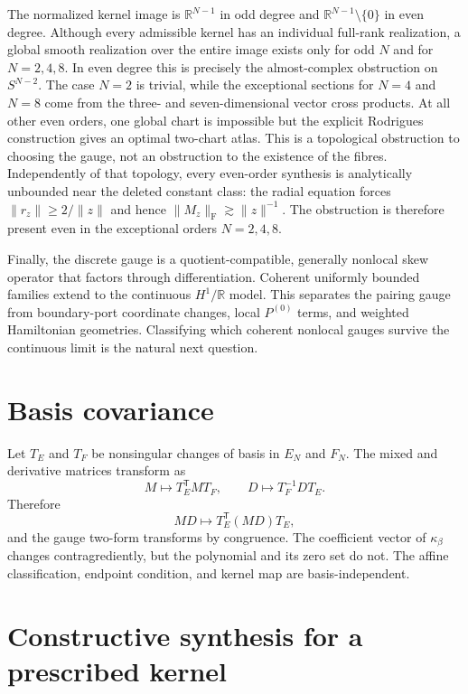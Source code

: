 \documentclass[11pt,a4paper]{article}
\theoremstyle{definition}
\theoremstyle{remark}
\newcommand{\R}{\mathbb{R}}
\begin{document}
The normalized kernel image is $\R^{N-1}$ in odd degree and
$\R^{N-1}\setminus\{0\}$ in even degree.  Although every admissible kernel has an individual
full-rank realization, a global smooth realization over the entire image exists only for odd
$N$ and for $N=2,4,8$.  In even degree this is precisely the almost-complex obstruction on
$S^{N-2}$.  The case $N=2$ is trivial, while the exceptional sections for $N=4$ and $N=8$
come from the three- and seven-dimensional vector cross products.  At all other even orders,
one global chart is impossible but the explicit Rodrigues construction gives an optimal
two-chart atlas.  This is a topological obstruction to choosing the gauge, not an obstruction
to the existence of the fibres.  Independently of that topology, every even-order synthesis
is analytically unbounded near the deleted constant class: the radial equation forces
$\|r_z\|\geq2/\|z\|$ and hence $\|M_z\|_{\mathrm F}\gtrsim\|z\|^{-1}$.  The obstruction is
therefore present even in the exceptional orders $N=2,4,8$.

Finally, the discrete gauge is a quotient-compatible, generally nonlocal skew operator that
factors through differentiation.  Coherent uniformly bounded families extend to the
continuous $H^1/\R$ model.  This separates the pairing gauge from boundary-port coordinate
changes, local $P^{(0)}$ terms, and weighted Hamiltonian geometries.  Classifying which
coherent nonlocal gauges survive the continuous limit is the natural next question.

\appendix

\section{Basis covariance}

Let $T_E$ and $T_F$ be nonsingular changes of basis in $E_N$ and $F_N$.  The mixed and
derivative matrices transform as
\[
 M\mapsto T_E^{\mathsf T}MT_F,
 \qquad
 D\mapsto T_F^{-1}DT_E.
\]
Therefore
\[
 MD\mapsto T_E^{\mathsf T}(MD)T_E,
\]
and the gauge two-form transforms by congruence.  The coefficient vector of
$\kappa_\beta$ changes contragrediently, but the polynomial and its zero set do not.  The
affine classification, endpoint condition, and kernel map are basis-independent.

\section{Constructive synthesis for a prescribed kernel}
\end{document}
